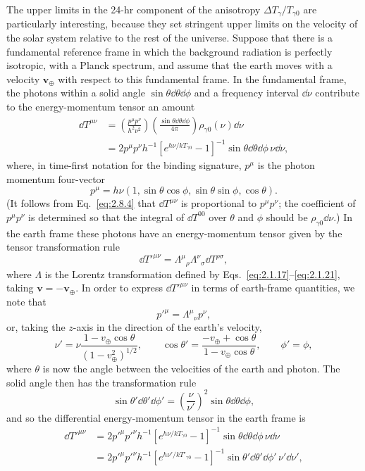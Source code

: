 The upper limits in the 24-hr component of the anisotropy
\(\Delta T_\gamma/T_{\gamma0}\) are particularly interesting, because they
set stringent upper limits on the velocity of the solar system relative to the
rest of the universe. Suppose that there is a fundamental reference frame in
which the background radiation is perfectly isotropic, with a Planck spectrum,
and assume that the earth moves with a velocity \(\mathbf v_\oplus\) with
respect to this fundamental frame. In the fundamental frame, the photons
within a solid angle \(\sin\theta\dd\theta\dd\phi\) and a frequency interval
\(\dd\nu\) contribute to the energy-momentum tensor an amount
\begin{align*}
  \dd T^{\mu\nu}
  &=
  \left(\frac{p^\mu p^\nu}{h^2\nu^2}\right)
  \left(\frac{\sin\theta\dd\theta\dd\phi}{4\pi}\right)
  \rho_{\gamma0}(\nu)\dd\nu
  \\
  &=
  2p^\mu p^\nu h^{-1}
  [e^{h\nu/kT_{\gamma0}}-1]^{-1}
  \sin\theta\dd\theta\dd\phi\,\nu\dd\nu,
\end{align*}
where, in time-first notation for the binding signature, \(p^\mu\) is the
photon momentum four-vector
\[
  p^\mu
  =
  h\nu(1,\sin\theta\cos\phi,\sin\theta\sin\phi,\cos\theta).
\]
(It follows from Eq.~\eqref{eq:2.8.4} that \(\dd T^{\mu\nu}\) is proportional
to \(p^\mu p^\nu\); the coefficient of \(p^\mu p^\nu\) is determined so that
the integral of \(\dd T^{00}\) over \(\theta\) and \(\phi\) should be
\(\rho_{\gamma0}\dd\nu\).) In the earth frame these photons have an
energy-momentum tensor given by the tensor transformation rule
\[
  \dd T'^{\mu\nu}
  =
  \Lambda^\mu{}_\rho\Lambda^\nu{}_\sigma\dd T^{\rho\sigma},
\]
where \(\Lambda\) is the Lorentz transformation defined by
Eqs.~\eqref{eq:2.1.17}--\eqref{eq:2.1.21}, taking
\(\mathbf v=-\mathbf v_\oplus\). In order to express \(\dd T'^{\mu\nu}\) in
terms of earth-frame quantities, we note that
\[
  p'^\mu=\Lambda^\mu{}_\nu p^\nu,
\]
or, taking the \(z\)-axis in the direction of the earth's velocity,
\[
  \nu'
  =
  \nu\frac{1-v_\oplus\cos\theta}{(1-v_\oplus^2)^{1/2}},
  \qquad
  \cos\theta'
  =
  \frac{-v_\oplus+\cos\theta}{1-v_\oplus\cos\theta},
  \qquad
  \phi'=\phi,
\]
where \(\theta\) is now the angle between the velocities of the earth and
photon. The solid angle then has the transformation rule
\[
  \sin\theta'\dd\theta'\dd\phi'
  =
  \left(\frac{\nu}{\nu'}\right)^2
  \sin\theta\dd\theta\dd\phi,
\]
and so the differential energy-momentum tensor in the earth frame is
\begin{align*}
  \dd T'^{\mu\nu}
  &=
  2p'^\mu p'^\nu h^{-1}
  [e^{h\nu/kT_{\gamma0}}-1]^{-1}
  \sin\theta\dd\theta\dd\phi\,\nu\dd\nu
  \\
  &=
  2p'^\mu p'^\nu h^{-1}
  [e^{h\nu'/kT'_{\gamma0}}-1]^{-1}
  \sin\theta'\dd\theta'\dd\phi'\,\nu'\dd\nu',
\end{align*}
